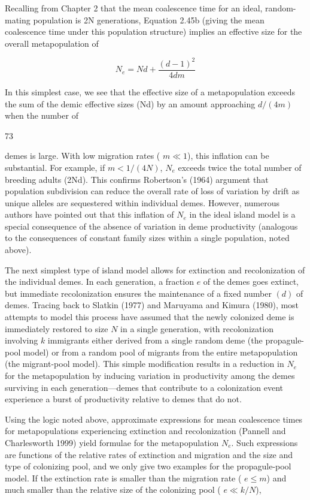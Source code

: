 \documentclass{article}
\begin{document}
Recalling from Chapter 2 that the mean coalescence time for an ideal, random-mating population is 2N generations, Equation 2.45b (giving the mean coalescence time under this population structure) implies an effective size for the overall metapopulation of

\begin{equation}
N_{e}=Nd+\frac{(d-1)^{2}}{4dm}
\tag{3.26}
\label{eq:3_26}
\end{equation}

In this simplest case, we see that the effective size of a metapopulation exceeds the sum of the demic effective sizes (Nd) by an amount approaching  $ d/(4m) $ when the number of

73

demes is large. With low migration rates ( $ m \ll 1 $), this inflation can be substantial. For example, if  $ m < 1/(4N) $,  $ N_e $ exceeds twice the total number of breeding adults (2Nd). This confirms Robertson's (1964) argument that population subdivision can reduce the overall rate of loss of variation by drift as unique alleles are sequestered within individual demes. However, numerous authors have pointed out that this inflation of  $ N_e $ in the ideal island model is a special consequence of the absence of variation in deme productivity (analogous to the consequences of constant family sizes within a single population, noted above).

The next simplest type of island model allows for extinction and recolonization of the individual demes. In each generation, a fraction $e$ of the demes goes extinct, but immediate recolonization ensures the maintenance of a fixed number $(d)$ of demes. Tracing back to Slatkin (1977) and Maruyama and Kimura (1980), most attempts to model this process have assumed that the newly colonized deme is immediately restored to size $N$ in a single generation, with recolonization involving $k$ immigrants either derived from a single random deme (the propagule-pool model) or from a random pool of migrants from the entire metapopulation (the migrant-pool model). This simple modification results in a reduction in $N_{e}$ for the metapopulation by inducing variation in productivity among the demes surviving in each generation—demes that contribute to a colonization event experience a burst of productivity relative to demes that do not.

Using the logic noted above, approximate expressions for mean coalescence times for metapopulations experiencing extinction and recolonization (Pannell and Charlesworth 1999) yield formulae for the metapopulation  $ N_e $. Such expressions are functions of the relative rates of extinction and migration and the size and type of colonizing pool, and we only give two examples for the propagule-pool model. If the extinction rate is smaller than the migration rate ( $ e \leq m $) and much smaller than the relative size of the colonizing pool ( $ e \ll k/N $),
\end{document}
